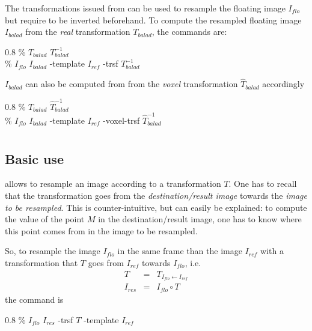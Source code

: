 The transformations issued from \baladin can be used to resample the floating image $I_{flo}$ but require to be inverted beforehand. To compute the resampled floating image $I_{balad}$ from the \textit{real} transformation $T_{balad}$, the commands are:
\begin{code}{0.8}
\% \invTrsf $T_{balad}$ $T^{-1}_{balad}$ \\
\% \applyTrsf $I_{flo}$ $I_{balad}$ -template $I_{ref}$ -trsf $T^{-1}_{balad}$
\end{code}
$I_{balad}$ can also be computed from from the \textit{voxel} transformation $\hat{T}_{balad}$ accordingly
\begin{code}{0.8}
\% \invTrsf $\hat{T}_{balad}$ $\hat{T}^{-1}_{balad}$ \\
\% \applyTrsf $I_{flo}$ $I_{balad}$ -template $I_{ref}$ -voxel-trsf $\hat{T}^{-1}_{balad}$
\end{code}








\section{\applyTrsf}
\label{sec:applyTrsf}

\subsection{Basic use}

\applyTrsf allows to resample an image according to a transformation $T$. One has to recall that the transformation goes from the \textit{destination/result image} towards the \textit{image to be resampled}. This is counter-intuitive, but can easily be explained: to compute the value of the point $M$ in the destination/result image, one has to know where this point comes from in the image to be resampled.

So, to resample the image $I_{flo}$ in the same frame than the image $I_{ref}$ with a transformation that $T$ goes from $I_{ref}$ towards $I_{flo}$, i.e. 
\begin{eqnarray*}
T & = & T_{I_{flo} \leftarrow I_{ref}} \\
I_{res} & = & I_{flo} \circ T
\end{eqnarray*}
 the command is  

\begin{code}{0.8}
\% \applyTrsf $I_{flo}$ $I_{res}$ -trsf $T$ -template $I_{ref}$
\end{code}

